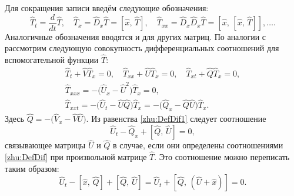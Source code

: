     Для сокращения записи введём следующие обозначения:
    $$
        \hat{T}_t=\frac{d}{d t}\hat{T},\quad \hat{T}_x = \hat{D}_x\hat{T} = [\hat{x},\,\hat{T}],\quad \hat{T}_{xx} = \hat{D}_x\hat{D}_x\hat{T} =
        [\hat{x},\,[\hat{x},\,\hat{T}]],\ldots.
    $$
    Аналогичные обозначения вводятся и для других матриц.
    По аналогии с \cite{zhu:ZhTMF09} рассмотрим следующую совокупность дифференциальных
    соотношений для вспомогательной функции $\hat{T}$:
    \begin{gather}
    \label{zhu:DefDif}
    \hat{T}_t+\hat{V} \hat{T}_x =0, \quad \hat{T}_{xx}+\hat{U}\hat{T}_x=0, \quad \hat{T}_{xt}+\hat{Q}\hat{T}_x=0,\\
    \nonumber
    \hat{T}_{xxx}=-\Big(\hat{U}_x-\hat{U}^2\Big)\hat{T}_x=0,\\
    \label{zhu:DefDif1}
    \hat{T}_{xxt}=-\Big(\hat{U}_t-\hat{U}\hat{Q}\Big)\hat{T}_x=-\Big(\hat{Q}_x-\hat{Q}\hat{U}\Big)\hat{T}_x.
    \end{gather}
    Здесь $\hat{Q} = -\Big(\hat{V}_x-\hat{V}\hat{U})$.  Из равенства \eqref{zhu:DefDif1}
    следует соотношение
    \begin{equation*}
         \hat{U}_t -\hat{Q}_x + [\hat{Q},\,\hat{U}] = 0,
    \end{equation*}
    связывающее матрицы $\hat{U}$ и $\hat{Q}$ в случае, если они
    определены соотношениями \eqref{zhu:DefDif} при произвольной матрице
    $\hat{T}$. Это соотношение можно переписать таким образом:
    \begin{equation}
    \label{zhu:EqUQ1}
    \hat{U}_t -[\hat{x},\,\hat{Q}] + [\hat{Q},\,\hat{U}]=\hat{U}_t  + [\hat{Q},\,(\hat{U}+\hat{x})]=0.
    \end{equation}

